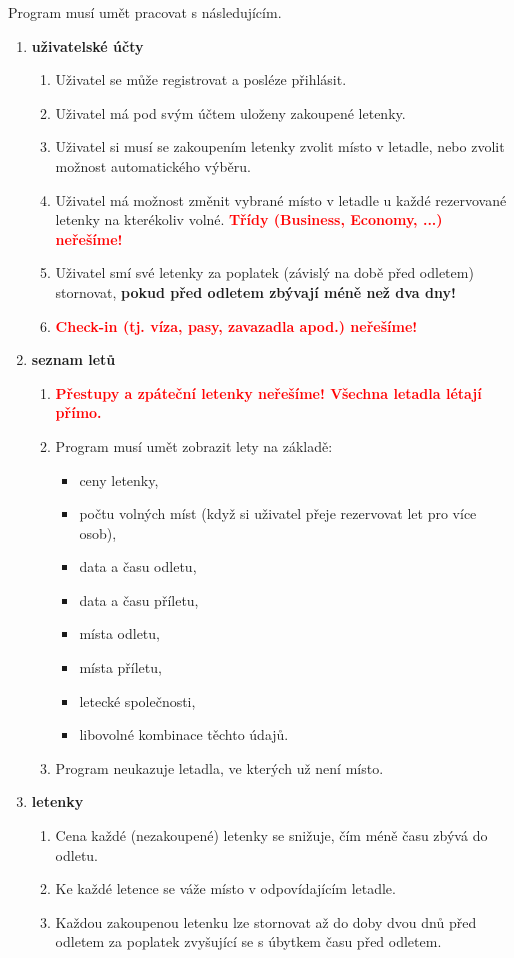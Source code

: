 \documentclass[a4paper,11pt]{article}
\begin{document}
Program musí umět pracovat s následujícím.
\begin{enumerate}[topsep=0pt]
 \item \textbf{uživatelské účty}
 \begin{enumerate}[topsep=0pt]
  \item Uživatel se může registrovat a posléze přihlásit.
  \item Uživatel má pod svým účtem uloženy zakoupené letenky.
  \item Uživatel si musí se zakoupením letenky zvolit místo v letadle, nebo
   zvolit mož\-nost automatického výběru.
  \item Uživatel má možnost změnit vybrané místo v letadle u každé rezervované
   letenky na kterékoliv volné. \textcolor{red}{\textbf{Třídy (Business,
   Economy, ...) neřešíme!}}
  \item Uživatel smí své letenky za poplatek (závislý na době před
   odletem) stornovat, \textbf{pokud před odletem zbývají méně než dva dny!}
  \item \textbf{\textcolor{red}{Check-in (tj. víza, pasy, zavazadla apod.)
   neřešíme!}}
 \end{enumerate}
 \item \textbf{seznam letů}
 \begin{enumerate}[topsep=0pt]
  \item \textcolor{red}{\textbf{Přestupy a zpáteční letenky neřešíme! Všechna
   letadla létají přímo.}}
  \item Program musí umět zobrazit lety na základě:
  \begin{itemize}[topsep=0pt]
   \item ceny letenky,
   \item počtu volných míst (když si uživatel přeje rezervovat let pro více
    osob),
   \item data a času odletu,
   \item data a času příletu,
   \item místa odletu,
   \item místa příletu,
   \item letecké společnosti,
   \item libovolné kombinace těchto údajů.
  \end{itemize}
  \item Program neukazuje letadla, ve kterých už není místo.
 \end{enumerate}
 \item \textbf{letenky}
 \begin{enumerate}[topsep=0pt]
  \item Cena každé (nezakoupené) letenky se snižuje, čím méně času zbývá do
   odletu.
  \item Ke každé letence se váže místo v odpovídajícím letadle.
  \item Každou zakoupenou letenku lze stornovat až do doby dvou dnů před odletem
   za po\-platek zvyšující se s úbytkem času před odletem.
 \end{enumerate}
\end{enumerate}
\end{document}

